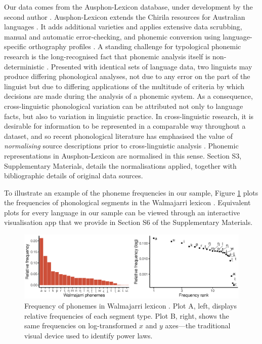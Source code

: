 Our data comes from the Ausphon-Lexicon database, under development by the second author \autocite{round_ausphon-lexicon_2017}. Ausphon-Lexicon extends the Chirila resources for Australian languages \autocite{bowern_chirila:_2016}. It adds additional varieties and applies extensive data scrubbing, manual and automatic error-checking, and phonemic conversion using language-specific orthography profiles \autocite{moran_unicode_2018}. A standing challenge for typological phonemic research is the long-recognised fact that phonemic analysis itself is non-deterministic \autocites{chao_non-uniqueness_1934}{hockett_problem_1963}{hyman_universals_2008}{dresher_contrastive_2009}. Presented with identical sets of language data, two linguists may produce differing phonological analyses, not due to any error on the part of the linguist but due to differing applications of the multitude of criteria by which decisions are made during the analysis of a phonemic system. As a consequence, cross-linguistic phonological variation can be attributed not only to language facts, but also to variation in linguistic practice. In cross-linguistic research, it is desirable for information to be represented in a comparable way throughout a dataset, and so recent phonological literature has emphasised the value of \emph{normalising} source descriptions prior to cross-linguistic analysis \autocites{lass_vowel_1984}{hyman_universals_2008}{van_der_hulst_phonological_2017}{round_matthew_2017}{kiparsky_formal_2018}. Phonemic representations in Ausphon-Lexicon are normalised in this sense. Section S3, Supplementary Materials, details the normalisations applied, together with bibliographic details of original data sources.

To illustrate an example of the phoneme frequencies in our sample, Figure \ref{fig:Figure-1} plots the frequencies of phonological segments in the Walmajarri lexicon \autocite{hudson_walmajarri_1993}. Equivalent plots for every language in our sample can be viewed through an interactive visualisation app that we provide in Section S6 of the Supplementary Materials.

\begin{figure}

{\centering \includegraphics[width=\textwidth]{03-phoneme-frequencies/fig/Fig1_walmajarri} 

}

\caption[Frequency of phonemes in Walmajarri lexicon \autocite{hudson_walmajarri_1993}]{Frequency of phonemes in Walmajarri lexicon \autocite{hudson_walmajarri_1993}. Plot A, left, displays relative frequencies of each segment type. Plot B, right, shows the same frequencies on log-transformed \(x\) and \(y\) axes---the traditional visual device used to identify power laws.}\label{fig:Figure-1}
\end{figure}



